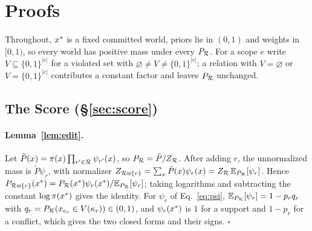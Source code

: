 \section{Proofs}
\label{app:proofs}

Throughout, $x^{\ast}$ is a fixed committed world, priors lie in $(0,1)$ and weights in $[0,1)$, so
every world has positive mass under every $P_{\mathcal{R}}$. For a scope $e$ write $V\subseteq\{0,1\}^{|e|}$
for a violated set with $\varnothing\ne V\ne\{0,1\}^{|e|}$; a relation with $V=\varnothing$ or
$V=\{0,1\}^{|e|}$ contributes a constant factor and leaves $P_{\mathcal{R}}$ unchanged.

\subsection{The Score (\S\ref{sec:score})}
\label{app:proof-score}

\paragraph{Lemma~\ref{lem:edit}.} Let $\tilde P(x)=\pi(x)\prod_{r'\in\mathcal{R}}\psi_{r'}(x)$, so
$P_{\mathcal{R}}=\tilde P/Z_{\mathcal{R}}$. After adding $r$, the unnormalized mass is $\tilde P\psi_r$, with normalizer
$Z_{\mathcal{R}\uplus\{r\}}=\sum_x\tilde P(x)\psi_r(x)=Z_{\mathcal{R}}\,\mathbb{E}_{P_{\mathcal{R}}}[\psi_r]$. Hence
$P_{\mathcal{R}\uplus\{r\}}(x^{\ast})=P_{\mathcal{R}}(x^{\ast})\psi_r(x^{\ast})/\mathbb{E}_{P_{\mathcal{R}}}[\psi_r]$; taking logarithms and subtracting
the constant $\log\pi(x^{\ast})$ gives the identity. For $\psi_r$ of Eq.~\ref{eq:psi},
$\mathbb{E}_{P_{\mathcal{R}}}[\psi_r]=1-p_rq_r$ with $q_r=P_{\mathcal{R}}(x_{e_r}\in V(\kappa_r))\in(0,1)$, and $\psi_r(x^{\ast})$ is $1$ for a
support and $1-p_r$ for a conflict, which gives the two closed forms and their signs. $\square$

